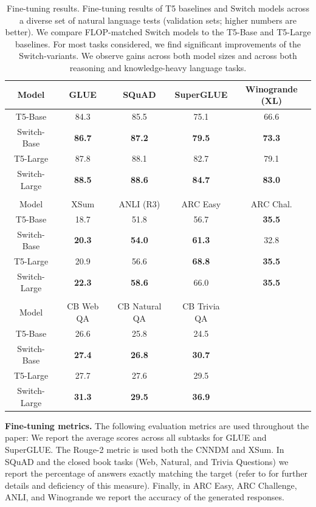 \documentclass[twoside,11pt]{article}
\begin{document}
\begin{table}[h!]
\begin{center}
\begin{tabular}{ccccc}
    \toprule
    {Model}& {GLUE} & {SQuAD} & {SuperGLUE} & {Winogrande (XL)} \\ \hline
    T5-Base & 84.3 & 85.5 & 75.1 & 66.6   \\
    Switch-Base & \textbf{86.7} & \textbf{87.2} & \textbf{79.5} & \textbf{73.3} \\
    T5-Large & 87.8 & 88.1 & 82.7 & 79.1 \\
    Switch-Large & \textbf{88.5} & \textbf{88.6} & \textbf{84.7} & \textbf{83.0}  \\
    \bottomrule
     & & & & \\
    \toprule
    {Model}& {XSum} & {ANLI (R3)} & {ARC Easy} & {ARC Chal.} \\ \hline
    T5-Base & 18.7 & 51.8 & 56.7 & \textbf{35.5}  \\
    Switch-Base & \textbf{20.3} & \textbf{54.0}  & \textbf{61.3} & 32.8  \\
    T5-Large  & 20.9 & 56.6 & \textbf{68.8} & \textbf{35.5} \\
    Switch-Large  & \textbf{22.3} & \textbf{58.6} & 66.0 & \textbf{35.5} \\
    \bottomrule
     & & & &  \\
    \toprule
    {Model} & {CB Web QA} & {CB Natural QA} & {CB Trivia QA} \\ \hline
    T5-Base & 26.6 & 25.8 & 24.5  \\
    Switch-Base  & \textbf{27.4} & \textbf{26.8} & \textbf{30.7}  \\
    T5-Large  & 27.7 & 27.6 & 29.5 & \\
    Switch-Large  & \textbf{31.3} & \textbf{29.5} & \textbf{36.9}\\
    \bottomrule
\end{tabular}
\caption{Fine-tuning results. Fine-tuning results of T5 baselines and Switch models across a diverse set of natural language tests (validation sets; higher numbers are better). We compare FLOP-matched Switch models to the T5-Base and T5-Large baselines. For most tasks considered, we find significant improvements of the Switch-variants. We observe gains across both model sizes and across both reasoning and knowledge-heavy language tasks.}
\label{tab: fine_tuning}
\end{center}
\end{table}

\textbf{Fine-tuning metrics.} The following evaluation metrics are used throughout the paper:
We report the average scores across all subtasks for GLUE and SuperGLUE.
The Rouge-2 metric is used both the CNNDM and XSum.
In SQuAD and the closed book tasks (Web, Natural, and Trivia Questions) we report the percentage of answers exactly matching the target (refer to \cite{roberts2020much} for further details and deficiency of this measure).
Finally, in ARC Easy, ARC Challenge, ANLI, and Winogrande we report the accuracy of the generated responses.
\end{document}
